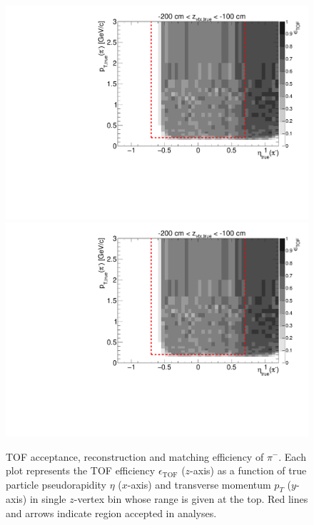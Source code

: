 \begin{figure}[hb]
\caption[TOF acceptance, reconstruction and matching efficiency of $\pi^{-}$.]{TOF acceptance, reconstruction and matching efficiency of $\pi^{-}$. Each plot represents the TOF efficiency $\epsilon_{\text{TOF}}$ ($z$-axis) as a function of true particle pseudorapidity $\eta$ ($x$-axis) and transverse momentum $p_{T}$ ($y$-axis) in single $z$-vertex bin whose range is given at the top. Red lines and arrows indicate region accepted in analyses.}\label{fig:eff_pion_minus}
\centering
\parbox{0.495\textwidth}{
  \centering
  \includegraphics[width=\linewidth,page=3]{graphics/eff/Eff2D_TOF_pion_Minus.pdf}\\
  \includegraphics[width=\linewidth,page=5]{graphics/eff/Eff2D_TOF_pion_Minus.pdf}\\
}
\end{figure}
